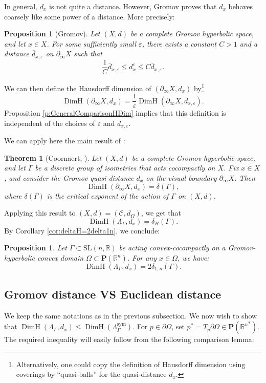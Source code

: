 \documentclass[JEP,XML,SOM,Unicode,NoEqCountersInSection,NoFloatCountersInSection,published]{cedram}
\newtheorem{theorem}[theo]{Theorem}
\newtheorem{prop}[theo]{Proposition}
\theoremstyle{definition}
\newcommand{\proj}{\mathbf{P}}
\newcommand{\R}{\mathbb{R}}
\newcommand{\cC}{\mathcal{C}}
\newcommand{\SL}{\mathrm{SL}}
\DeclareMathOperator{\DimH}{DimH}
\let\epsilon\varepsilon
\let\G\Gamma
\begin{document}
In general, $d_x$ is not quite a distance. However, Gromov proves that $d_x$ behaves coarsely like some power of a distance. More precisely:
\begin{prop}[Gromov] Let $(X,d)$ be a complete Gromov hyperbolic space, and let $x\in X$. For some sufficiently small $\epsilon$, there exists a constant $C>1$ and a distance $\bar d_{x,\epsilon}$ on $\partial_\infty X$ such that
\[\frac{1}{C} \bar d_{x,\epsilon} \leq d_x^\epsilon \leq C \bar d_{x,\epsilon}.\]
\end{prop}
We can then define the Hausdorff dimension of $(\partial_\infty X, d_x)$ by\footnote{Alternatively, one could copy the definition of Hausdorff dimension using coverings by ``quasi-balls'' for the quasi-distance $d_x$.}
\[\DimH(\partial_\infty X, d_x) = \frac{1}{\epsilon} \DimH(\partial_\infty X, \bar d_{x,\epsilon}).\]
Proposition \ref{p:GeneralComparisonHDim} implies that this definition is independent of the choices of $\epsilon$ and $d_{x,\epsilon}$.

We can apply here the main result of \cite{Coornaert}:

\begin{theorem}[Coornaert, \cite{Coornaert}] \label{theo - coornaert}
Let $(X,d)$ be a complete Gromov hyperbolic space, and let $\G$ be a discrete group of isometries that acts cocompactly on $X$. Fix $x\in X$, and consider the Gromov quasi-distance $d_x$ on the visual boundary $\partial_\infty X$. Then \[\DimH(\partial_\infty X,d_x)= \delta(\G),\] where $\delta(\G)$ is the critical exponent of the action of $\G$ on $(X,d)$.
\end{theorem}
Applying this result to $(X,d)=(\cC,d_\Omega)$, we get that \[\DimH(\Lambda_\G,d_x)=\delta_H(\G).\] By Corollary \ref{cor:deltaH=2delta1n}, we conclude:

\begin{prop} \label{prop - dimension Gromov = exposant critique} Let $\G\subset \SL(n,\R)$ be acting convex-cocompactly on a Gromov-hyperbolic convex domain $\Omega\subset\proj(\R^n)$. For any $x\in \Omega$, we have:
\[ \DimH(\Lambda_\G,d_x)=2\delta_{1,n}(\G).\]
\end{prop}

\subsection{Gromov distance VS Euclidean distance}

We keep the same notations as in the previous subsection. We now wish to show that $\DimH(\Lambda_\G,d_x)\leq \DimH(\Lambda_\G^{\mathrm{sym}})$. For $p\in \partial \Omega$, set $p^*=T_p\partial\Omega \in \proj({\R^n}^*)$. The required inequality will easily follow from the following comparison lemma:
\end{document}
